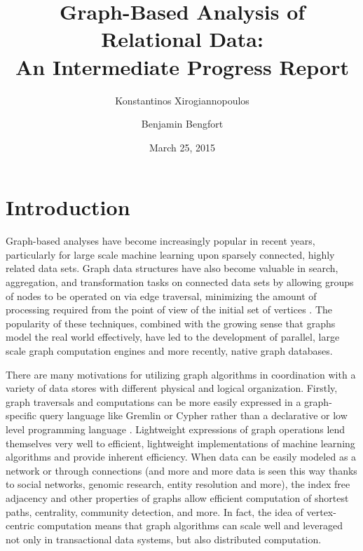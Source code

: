 \documentclass[11pt,letterpaper]{article}
\begin{document}
\title{Graph-Based Analysis of Relational Data:\\ An Intermediate Progress Report}

\author[ ]{Konstantinos Xirogiannopoulos}
\author[ ]{Benjamin Bengfort}

\date{March 25, 2015}

\maketitle


\section*{Introduction}

Graph-based analyses have become increasingly popular in recent years, particularly for large scale machine learning upon sparsely connected, highly related data sets. Graph data structures have also become valuable in search, aggregation, and transformation tasks on connected data sets by allowing groups of nodes to be operated on via edge traversal, minimizing the amount of processing required from the point of view of the initial set of vertices \cite{berretti_efficient_2001}. The popularity of these techniques, combined with the growing sense that graphs model the real world effectively, have led to the development of parallel, large scale graph computation  engines and more recently, native graph databases.

There are many motivations for utilizing graph algorithms in coordination with a variety of data stores with different physical and logical organization. Firstly, graph traversals and computations can be more easily expressed in a graph-specific query language like Gremlin \cite{rodriguez_gremlin_2013} or Cypher \cite{miller_graph_2013} rather than a declarative or low level programming language \cite{rodriguez_exploring_2012}. Lightweight expressions of graph operations lend themselves very well to efficient, lightweight implementations of machine learning algorithms and provide inherent efficiency. When data can be easily modeled as a network or through connections (and more and more data is seen this way thanks to social networks, genomic research, entity resolution and more), the index free adjacency and other properties of graphs allow efficient computation of shortest paths, centrality, community detection, and more. In fact, the idea of vertex-centric computation \cite{malewicz_pregel:_2010} means that graph algorithms can scale well and leveraged not only in transactional data systems, but also distributed computation.
\end{document}

